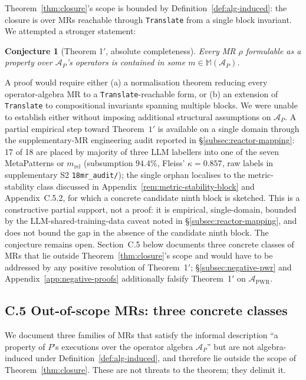 \documentclass[manuscript]{acmart}
\newtheorem*{conjecture*}{Conjecture}
\begin{document}
Theorem~\ref{thm:closure}'s scope is bounded by Definition~\ref{def:alg-induced}: the closure is over MRs reachable through \texttt{Translate} from a single block invariant. We attempted a stronger statement:

\begin{conjecture*}[Theorem 1$'$, absolute completeness]
\label{conj:absolute}
Every MR $\rho$ formulable as a property over $\mathcal{A}_P$'s operators is contained in some $m \in \mathbb{M}(\mathcal{A}_P)$.
\end{conjecture*}

A proof would require either (a) a normalisation theorem reducing every operator-algebra MR to a \texttt{Translate}-reachable form, or (b) an extension of \texttt{Translate} to compositional invariants spanning multiple blocks. We were unable to establish either without imposing additional structural assumptions on $\mathcal{A}_P$. A partial empirical step toward Theorem~$1'$ is available on a single domain through the supplementary-MR engineering audit reported in \S\ref{subsec:reactor-mapping}: 17 of 18 are placed by majority of three LLM labellers into one of the seven MetaPatterns or $m_{\mathrm{rel}}$ (subsumption $94.4\%$, Fleiss' $\kappa = 0.857$, raw labels in supplementary S2 \texttt{18mr\_audit/}); the single orphan localises to the metric-stability class discussed in Appendix~\ref{rem:metric-stability-block} and Appendix~C.5.2, for which a concrete candidate ninth block is sketched. This is a constructive partial support, not a proof: it is empirical, single-domain, bounded by the LLM-shared-training-data caveat noted in \S\ref{subsec:reactor-mapping}, and does not bound the gap in the absence of the candidate ninth block. The conjecture remains open. Section~C.5 below documents three concrete classes of MRs that lie outside Theorem~\ref{thm:closure}'s scope and would have to be addressed by any positive resolution of Theorem~1$'$; \S\ref{subsec:negative-pwr} and Appendix~\ref{app:negative-proofs} additionally falsify Theorem~1$'$ on $\mathcal{A}_{\mathrm{PWR}}$.

\subsection*{C.5 Out-of-scope MRs: three concrete classes}
\label{app:out-of-scope}

We document three families of MRs that satisfy the informal description ``a property of $P$'s executions over the operator algebra $\mathcal{A}_P$'' but are not algebra-induced under Definition~\ref{def:alg-induced}, and therefore lie outside the scope of Theorem~\ref{thm:closure}. These are not threats to the theorem; they delimit it.
\end{document}
